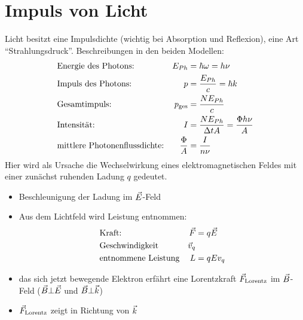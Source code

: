 \section{Impuls von Licht}
Licht besitzt eine Impulsdichte (wichtig bei Absorption und
Reflexion), eine Art \enquote{Strahlungsdruck}. Beschreibungen in den
beiden Modellen:
\begin{align*}
  &\text{Energie des Photons:\index{Photonenenergie}} 
  & E_{Ph}&=\hbar\omega=h\nu\\
  &\text{Impuls des Photons:\index{Photonenimpuls}} 
  & p &= \frac{E_{Ph}}{c}=\hbar k\\
  &\text{Gesamtimpuls:} 
  & p_\text{ges} &= \frac{N E_{Ph}}{c}\\
  &\text{Intensität:} 
  & I &= \frac{N E_{Ph}}{\Delta t A} = \frac{\Phi h \nu}{A}\\
  &\text{mittlere Photonenflussdichte:\index{Photonenflussdichte}} 
  &\frac{\Phi}{A} &= \frac{I}{n\nu}\\
\end{align*}%
%
%
%
%
%
Hier wird als Ursache die Wechselwirkung eines elektromagnetischen
Feldes mit einer zunächst ruhenden Ladung $q$ gedeutet.
\begin{itemize}
\item Beschleunigung der Ladung im $\vec{E}$-Feld 
\item Aus dem Lichtfeld wird Leistung entnommen:
  \begin{align*}
    &\text{Kraft:} & \vec{F} &= q\vec{E}\\
    &\text{Geschwindigkeit} & \vec{v}_q\\
    &\text{entnommene Leistung} & L &= qEv_q
  \end{align*}%
\item das sich jetzt bewegende Elektron erfährt eine Lorentzkraft $\vec{F}_\text{Lorentz}$
  im $\vec{B}$-Feld ($\vec{B}\bot\vec{E}$ und $\vec{B}\bot\vec{k}$)
\item $\vec{F}_\text{Lorentz}$ zeigt in Richtung von $\vec{k}$
\end{itemize}

